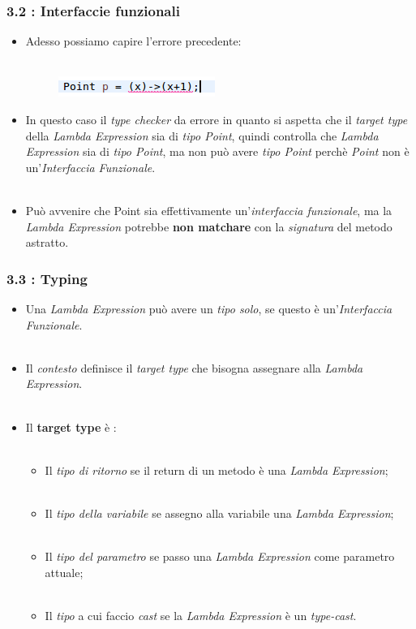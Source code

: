 \documentclass{beamer}
\begin{document}
\begin{frame}
	\frametitle{\textbf{3.2 : Interfaccie funzionali}}
	\begin{itemize}
		\item
			Adesso possiamo capire l'errore precedente:\\\
			\begin{figure}
				\centering
				\includegraphics[width=0.3\linewidth]{image/target.png}
				\label{fig:target}
			\end{figure}
		\item
			In questo caso il \textit{type checker} da errore in quanto si aspetta che il \textit{target type} della \textit{Lambda Expression} sia di \textit{tipo Point}, quindi controlla che \textit{Lambda Expression} sia di \textit{tipo Point}, ma non può avere \textit{tipo Point} perchè \textit{Point} non è un'\textit{Interfaccia Funzionale}.\\\
		\item
			Può avvenire che Point sia effettivamente un'\textit{interfaccia funzionale}, ma la \textit{Lambda Expression} potrebbe \textbf{non matchare} con la \textit{signatura} del metodo astratto.
	\end{itemize}
\end{frame}


\begin{frame}
	\frametitle{\textbf{3.3 : Typing}}
	\begin{itemize}
		\item
			Una \textit{Lambda Expression} può avere un \textit{tipo solo}, se questo è un'\textit{Interfaccia Funzionale}.\\\
		\item
			Il \textit{contesto} definisce il \textit{target type} che bisogna assegnare alla \textit{Lambda Expression}.\\\
		\item
			Il \textbf{target type} è :\\\
			\begin{itemize}
				\item
					Il \textit{tipo di ritorno} se il return di un metodo è una \textit{Lambda Expression};\\\
				\item
					Il \textit{tipo della variabile} se assegno alla variabile una \textit{Lambda Expression};\\\
				\item
					Il \textit{tipo del parametro} se passo una \textit{Lambda Expression} come parametro attuale;\\\
				\item
					Il \textit{tipo} a cui faccio \textit{cast} se la \textit{Lambda Expression} è un \textit{type-cast}.
			\end{itemize}
	\end{itemize}
\end{frame}
\end{document}
